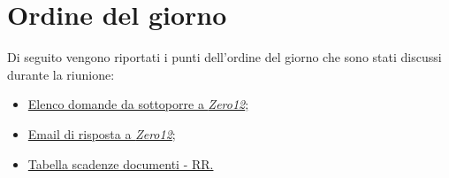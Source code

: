 \clearpage
\section{Ordine del giorno}
Di seguito vengono riportati i punti dell’ordine del giorno che sono stati discussi durante la riunione:
\begin{itemize}
	\item \hyperref[sec:elencodomande]{Elenco domande da sottoporre a \emph{Zero12};}
	\item \hyperref[sec:mail]{Email di risposta a \emph{Zero12};}
	\item \hyperref[sec:scadenze]{Tabella scadenze documenti - RR.}
\end{itemize}